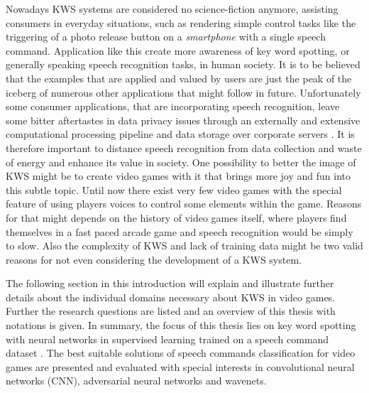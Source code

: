 Nowadays KWS systems are considered no science-fiction anymore, assisting consumers in everyday situations, such as rendering simple control tasks like the triggering of a photo release button on a \emph{smartphone} with a single speech command.
Application like this create more awareness of key word spotting, or generally speaking speech recognition tasks, in human society.
It is to be believed that the examples that are applied and valued by users are just the peak of the iceberg of numerous other applications that might follow in future.
Unfortunately some consumer applications, that are incorporating speech recognition, leave some bitter aftertastes in data privacy issues through an externally and extensive computational processing pipeline and data storage over corporate servers \cite{Tang2018}.
It is therefore important to distance speech recognition from data collection and waste of energy and enhance its value in society.
One possibility to better the image of KWS might be to create video games with it that brings more joy and fun into this subtle topic.
Until now there exist very few video games with the special feature of using players voices to control some elements within the game.
Reasons for that might depends on the history of video games itself, where players find themselves in a fast paced arcade game and speech recognition would be simply to slow. 
Also the complexity of KWS and lack of training data might be two valid reasons for not even considering the development of a KWS system.

The following section in this introduction will explain and illustrate further details about the individual domains necessary about KWS in video games. 
Further the research questions are listed and an overview of this thesis with notations is given.
In summary, the focus of this thesis lies on key word spotting with neural networks in supervised learning trained on a speech command dataset \cite{Warden2018}.
The best suitable solutions of speech commands classification for video games are presented and evaluated with special interests in convolutional neural networks (CNN), adversarial neural networks and wavenets.




\newpage










